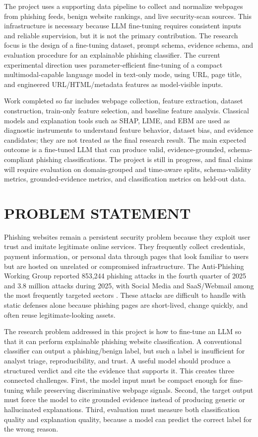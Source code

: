 \documentclass[12pt,letterpaper]{article}
\begin{document}
The project uses a supporting data pipeline to collect and normalize webpages from phishing feeds, benign website rankings, and live security-scan sources. This infrastructure is necessary because LLM fine-tuning requires consistent inputs and reliable supervision, but it is not the primary contribution. The research focus is the design of a fine-tuning dataset, prompt schema, evidence schema, and evaluation procedure for an explainable phishing classifier. The current experimental direction uses parameter-efficient fine-tuning of a compact multimodal-capable language model in text-only mode, using URL, page title, and engineered URL/HTML/metadata features as model-visible inputs.

Work completed so far includes webpage collection, feature extraction, dataset construction, train-only feature selection, and baseline feature analysis. Classical models and explanation tools such as SHAP, LIME, and EBM are used as diagnostic instruments to understand feature behavior, dataset bias, and evidence candidates; they are not treated as the final research result. The main expected outcome is a fine-tuned LLM that can produce valid, evidence-grounded, schema-compliant phishing classifications. The project is still in progress, and final claims will require evaluation on domain-grouped and time-aware splits, schema-validity metrics, grounded-evidence metrics, and classification metrics on held-out data.

\section{PROBLEM STATEMENT}
Phishing websites remain a persistent security problem because they exploit user trust and imitate legitimate online services. They frequently collect credentials, payment information, or personal data through pages that look familiar to users but are hosted on unrelated or compromised infrastructure. The Anti-Phishing Working Group reported 853,244 phishing attacks in the fourth quarter of 2025 and 3.8 million attacks during 2025, with Social Media and SaaS/Webmail among the most frequently targeted sectors \cite{apwg2025q4}. These attacks are difficult to handle with static defenses alone because phishing pages are short-lived, change quickly, and often reuse legitimate-looking assets.

The research problem addressed in this project is how to fine-tune an LLM so that it can perform explainable phishing website classification. A conventional classifier can output a phishing/benign label, but such a label is insufficient for analyst triage, reproducibility, and trust. A useful model should produce a structured verdict and cite the evidence that supports it. This creates three connected challenges. First, the model input must be compact enough for fine-tuning while preserving discriminative webpage signals. Second, the target output must force the model to cite grounded evidence instead of producing generic or hallucinated explanations. Third, evaluation must measure both classification quality and explanation quality, because a model can predict the correct label for the wrong reason.
\end{document}
